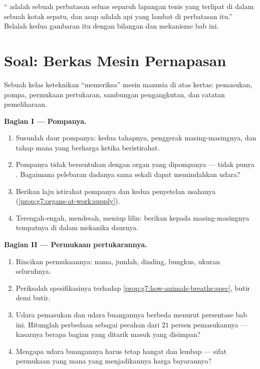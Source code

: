 \begin{exercise}[$\star\star\star$]\label{exo:g7:lungs-and-gas-exchange:12}
`` adalah sebuah perbatasan seluas separuh lapangan tenis
yang terlipat di dalam sebuah kotak sepatu, dan asap adalah api yang
lambat di perbatasan itu.'' Belalah kedua gambaran itu dengan bilangan
dan mekanisme bab ini.
\end{exercise}

\section{Soal: Berkas Mesin Pernapasan}

\begin{problem}\label{pb:g7:lungs-and-gas-exchange:1}
Sebuah kelas keteknikan ``memeriksa'' mesin  manusia di atas
kertas: pemasukan, pompa, permukaan pertukaran, sambungan
pengangkutan, dan catatan pemeliharaan.

\medskip\noindent\textbf{Bagian I --- Pompanya.}
\begin{enumerate}
  \item Susunlah daur pompanya: kedua tahapnya, penggerak
        masing-masingnya, dan tahap mana yang berharga  ketika
        beristirahat.
  \item Pompanya tidak bersentuhan dengan  organ yang dipompanya
        ---  tidak punya . Bagaimana pelebaran dadanya
        sama sekali dapat memindahkan udara?
  \item Berikan laju istirahat pompanya dan kedua penyetelan usahanya
        (\cref{prop:g7:organs-at-work:supply}).
  \item Terengah-engah, mendesah, meniup lilin: berikan kepada
        masing-masingnya tempatnya di dalam mekanika daurnya.
\end{enumerate}

\medskip\noindent\textbf{Bagian II --- Permukaan
pertukarannya.}
\begin{enumerate}[resume]
  \item Rincikan permukaannya: nama, jumlah, dinding, bungkus, ukuran
        seluruhnya.
  \item Periksalah spesifikasinya terhadap
        \cref{prop:g7:how-animals-breathe:spec}, butir demi butir.
  \item Udara pemasukan dan udara buangannya berbeda menurut persentase
        bab ini. Hitunglah perbedaan  sebagai pecahan dari
        $21$ persen pemasukannya --- kasarnya berapa bagian 
        yang ditarik masuk yang disimpan?
  \item Mengapa udara buangannya harus tetap hangat dan lembap ---
        sifat permukaan yang mana yang menjadikannya harga bayarannya?
\end{enumerate}


\end{problem}
